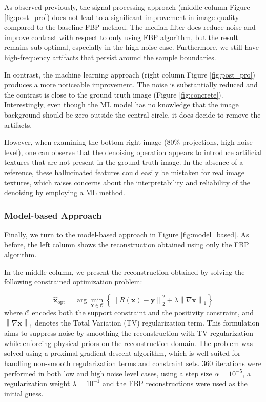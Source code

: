 \documentclass{article}
\begin{document}
As observed previously, the signal processing approach (middle column Figure \ref{fig:post_pro}) does not lead to a significant improvement in image quality compared to the baseline FBP method. The median filter does reduce noise and improve contrast with respect to only using FBP algorithm, but the result remains sub-optimal, especially in the high noise case. Furthermore, we still have high-frequency artifacts that persist around the sample boundaries.
\medskip

In contrast, the machine learning approach (right column Figure \ref{fig:post_pro}) produces a more noticeable improvement. The noise is substantially reduced and the contrast is close to the ground truth image (Figure \ref{fig:concrete}). Interestingly,  even though the ML model has no knowledge that the image background should be zero outside the central circle, it does decide to remove the artifacts. 

However, when examining the bottom-right image (80\% projections, high noise level), one can observe that the denoising operation appears to introduce artificial textures that are not present in the ground truth image. In the absence of a reference, these hallucinated features could easily be mistaken for real image textures, which raises concerns about the interpretability and reliability of the denoising by employing a ML method.


\subsubsection*{Model-based Approach}
Finally, we turn to the model-based approach in Figure \ref{fig:model_based}. As before, the left column shows the reconstruction obtained using only the FBP algorithm.

In the middle column, we present the reconstruction obtained by solving the following constrained optimization problem:

\begin{equation}
\hat{\mathbf{x}}_{\mathrm{opt}} = \arg\min_{\mathbf{x} \in \mathcal{C}} \left\{ \left\| R(\mathbf{x}) - \mathbf{y} \right\|_2^2 + \lambda \left\| \nabla \mathbf{x} \right\|_1 \right\}
\end{equation}
where $\mathcal{C}$ encodes both the support constraint and the positivity constraint, and $\left\| \nabla \mathbf{x} \right\|_1$  denotes the Total Variation (TV) regularization term. This formulation aims to suppress noise by smoothing the reconstruction with TV regularization while enforcing physical priors on the reconstruction domain. The problem was solved using a proximal gradient descent algorithm, which is well-suited for handling non-smooth regularization terms and constraint sets. 360 iterations were performed in both low and high noise level cases, using a step size $\alpha = 10^{-5}$, a regularization weight $\lambda = 10^{-1}$ and the FBP reconstructions were used as the initial guess.
\medskip
\end{document}
